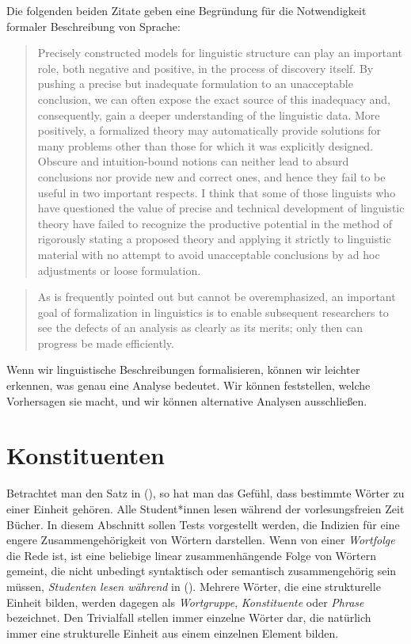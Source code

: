 Die folgenden beiden Zitate geben eine Begründung für die Notwendigkeit
formaler Beschreibung von Sprache:  
\begin{quote}
Precisely constructed models for linguistic structure can play an
important role, both negative and positive, in the process of discovery 
itself. By pushing a precise but inadequate formulation to
an unacceptable conclusion, we can often expose the exact source
of this inadequacy and, consequently, gain a deeper understanding
of the linguistic data. More positively, a formalized theory may 
automatically provide solutions for many problems other than those
for which it was explicitly designed. Obscure and intuition-bound
notions can neither lead to absurd conclusions nor provide new and
correct ones, and hence they fail to be useful in two important respects. 
I think that some of those linguists who have questioned
the value of precise and technical development of linguistic theory
have failed to recognize the productive potential in the method
of rigorously stating a proposed theory and applying it strictly to
linguistic material with no attempt to avoid unacceptable conclusions 
by ad hoc adjustments or loose formulation.
\citep[]{Chomsky57a}
\end{quote}

\begin{quote}
As is frequently pointed out but cannot be overemphasized, an important goal
of formalization in linguistics is to enable subsequent researchers to see the defects
of an analysis as clearly as its merits; only then can progress be made efficiently.
\citep[]{Dowty79a}
\end{quote}
%
Wenn wir linguistische Beschreibungen formalisieren, können wir leichter
erkennen, was genau eine Analyse bedeutet. Wir können feststellen, welche
Vorhersagen sie macht, und wir können alternative Analysen ausschließen.




\section{Konstituenten}
\label{konstituententests}

Betrachtet man den Satz in (), so hat man das Gefühl, dass bestimmte Wörter zu einer
Einheit gehören.
\ea
Alle Student*innen lesen während der vorlesungsfreien Zeit Bücher.
\z
In diesem Abschnitt sollen Tests vorgestellt werden, die Indizien für eine engere
Zusammengehörigkeit von Wörtern darstellen. Wenn von einer \emph{Wortfolge}
die Rede ist, ist eine beliebige linear zusammenhängende Folge von Wörtern gemeint, 
die nicht unbedingt syntaktisch oder semantisch zusammengehörig sein müssen, \zb
\emph{Studenten lesen während} in (). Mehrere Wörter, die eine strukturelle Einheit bilden,
werden dagegen als \emph{Wortgruppe}, \emph{Konstituente}
oder \emph{Phrase} bezeichnet. Den Trivialfall stellen immer einzelne Wörter dar, die
natürlich immer eine strukturelle Einheit aus einem einzelnen Element bilden.

